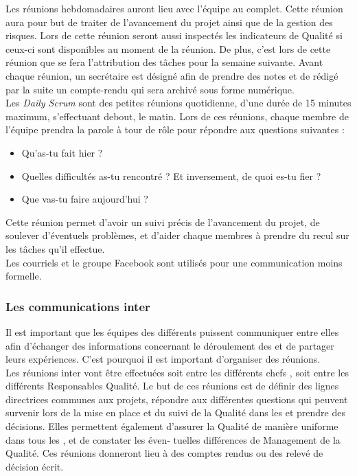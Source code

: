 Les réunions hebdomadaires auront lieu avec l’équipe au complet. Cette réunion aura pour but de traiter de l’avancement du projet ainsi que de la gestion des risques. Lors de cette réunion seront aussi inspectés les indicateurs de Qualité si ceux-ci sont disponibles au moment de la réunion. De plus, c’est lors de cette réunion que se fera l’attribution des tâches pour la semaine suivante. Avant chaque réunion, un secrétaire est désigné afin de prendre des notes et de rédigé par la suite un compte-rendu qui sera archivé sous forme numérique.\\

Les \textit{Daily Scrum} sont des petites réunions quotidienne, d’une durée de 15 minutes maximum, s’effectuant debout, le matin. Lors de ces réunions, chaque membre de l’équipe prendra la parole à tour de rôle pour répondre aux questions suivantes :
\begin{itemize}
\item Qu’as-tu fait hier ?
\item Quelles difficultés as-tu rencontré ? Et inversement, de quoi es-tu fier ?
\item Que vas-tu faire aujourd’hui ?
\end{itemize}
Cette réunion permet d’avoir un suivi précis de l’avancement du projet, de soulever d'éventuels problèmes, et d’aider chaque membres à prendre du recul sur les tâches qu’il effectue.\\

Les courriels et le groupe Facebook sont utilisés pour une communication moins formelle. 

\subsubsection*{Les communications inter\picCourt{}}  

Il est important que les équipes des différents \PICCourt puissent communiquer entre elles afin d’échanger des informations concernant le déroulement des \PICCourt et de partager leurs expériences. C'est pourquoi il est important d'organiser des réunions.\\

Les réunions inter\PICCourt{} vont être effectuées soit entre les différents chefs \PICCourt{}, soit entre les différents Responsables Qualité. Le but de ces réunions est de définir des lignes directrices communes aux projets, répondre aux différentes questions qui peuvent survenir lors de la mise en place et du
suivi de la Qualité dans les \PICCourt et prendre des décisions. Elles permettent également d’assurer la Qualité de manière uniforme dans tous les \PICCourt, et de constater les éven-
tuelles différences de Management de la Qualité. Ces réunions donneront lieu à des comptes rendus ou des relevé de décision écrit.

